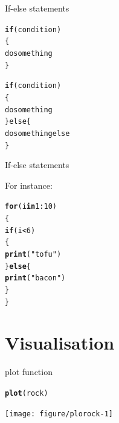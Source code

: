 \documentclass[10pt]{beamer}\usepackage[]{graphicx}\usepackage[]{color}
\makeatletter
\newcommand{\hlnum}[1]{\textcolor[rgb]{0.686,0.059,0.569}{#1}}%
\newcommand{\hlstr}[1]{\textcolor[rgb]{0.192,0.494,0.8}{#1}}%
\newcommand{\hlopt}[1]{\textcolor[rgb]{0,0,0}{#1}}%
\newcommand{\hlstd}[1]{\textcolor[rgb]{0.345,0.345,0.345}{#1}}%
\newcommand{\hlkwa}[1]{\textcolor[rgb]{0.161,0.373,0.58}{\textbf{#1}}}%
\newcommand{\hlkwd}[1]{\textcolor[rgb]{0.737,0.353,0.396}{\textbf{#1}}}%
\newenvironment{kframe}{%
 \def\at@end@of@kframe{}%
 \ifinner\ifhmode%
  \def\at@end@of@kframe{\end{minipage}}%
  \begin{minipage}{\columnwidth}%
 \fi\fi%
 \def\FrameCommand##1{\hskip\@totalleftmargin \hskip-\fboxsep
 \colorbox{shadecolor}{##1}\hskip-\fboxsep
     \hskip-\linewidth \hskip-\@totalleftmargin \hskip\columnwidth}%
 \MakeFramed {\advance\hsize-\width
   \@totalleftmargin\z@ \linewidth\hsize
   \@setminipage}}%
 {\par\unskip\endMakeFramed%
 \at@end@of@kframe}
\newenvironment{knitrout}{}{} %
\makeatother
\begin{document}
\begin{frame}[fragile]{If-else statements}

\begin{knitrout}
\color{fgcolor}\begin{kframe}
\begin{alltt}
\hlkwd{if}(condition)
\{
  do something
\}
\end{alltt}
\end{kframe}
\end{knitrout}


\begin{knitrout}
\color{fgcolor}\begin{kframe}
\begin{alltt}
\hlkwd{if}(condition)
\{
  do something
\}else\{
  do something else
\}
\end{alltt}
\end{kframe}
\end{knitrout}

\end{frame}

\begin{frame}[fragile]{If-else statements}

For instance:
\begin{knitrout}
\color{fgcolor}\begin{kframe}
\begin{alltt}
\hlkwa{for} \hlstd{(i} \hlkwa{in} \hlnum{1}\hlopt{:}\hlnum{10}\hlstd{)}
\hlstd{\{}
  \hlkwa{if}\hlstd{(i} \hlopt{<} \hlnum{6}\hlstd{)}
  \hlstd{\{}
    \hlkwd{print}\hlstd{(}\hlstr{"tofu"}\hlstd{)}
  \hlstd{\}}\hlkwa{else}\hlstd{\{}
    \hlkwd{print}\hlstd{(}\hlstr{"bacon"}\hlstd{)}
  \hlstd{\}}
\hlstd{\}}
\end{alltt}
\end{kframe}
\end{knitrout}
\end{frame}


\section{Visualisation}

\begin{frame}[fragile]{plot function}

\begin{knitrout}
\color{fgcolor}\begin{kframe}
\begin{alltt}
\hlkwd{plot}\hlstd{(rock)}
\end{alltt}
\end{kframe}
\texttt{[image: figure/plorock-1]} 

\end{knitrout}

\end{frame}
\end{document}
